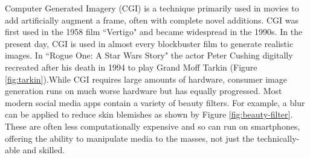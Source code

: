 Computer Generated Imagery (CGI) is a technique primarily used in movies to add artificially augment a frame, often with complete novel additions. CGI was first used in the 1958 film ``Vertigo" and became widespread in the 1990s\cite{ozturk2023vicious}. In the present day, CGI is used in almost every blockbuster film to generate realistic images. In ``Rogue One: A Star Wars Story" the actor Peter Cushing digitally recreated after his death in 1994 to play Grand Moff Tarkin (Figure \ref{fig:tarkin}).While CGI requires large amounts of hardware, consumer image generation runs on much worse hardware but has equally progressed. Most modern social media apps contain a variety of beauty filters\cite{corcoran2014digital}. For example, a blur can be applied to reduce skin blemishes as shown by Figure \ref{fig:beauty-filter}. These are often less computationally expensive and so can run on smartphones, offering the ability to manipulate media to the masses, not just the technically-able and skilled.

